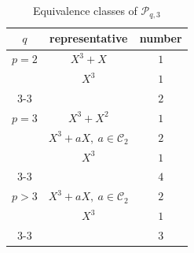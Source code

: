 \documentclass{amsart}
\numberwithin{equation}{section}
\theoremstyle{definition}
\begin{document}
\begin{table}[h]
\caption{Equivalence classes of $\mathcal P_{q,3}$}\label{Tb-q3}
   \renewcommand*{\arraystretch}{1.2}
    \centering
     \begin{tabular}{c|c|c}
     \hline
     	$q$ & representative & number \\ \hline      
        $p=2$ & $X^3+X$ & $1$  \\ 
        & $X^3$ & $1$ \\ \cline{3-3}   
        & & $2$  \\
         \hline
        $p=3$ & $X^3+X^2$ & $1$  \\    
        & $X^3+aX,\ a\in\mathcal C_2$ & $2$  \\
        & $X^3$ & $1$ \\ \cline{3-3}
        & & $4$ \\   \hline 
        $p>3$ & $X^3+aX,\ a\in\mathcal C_2$ & $2$  \\
        & $X^3$ & $1$ \\ \cline{3-3}
        & & $3$ \\   \hline
    \end{tabular}
\end{table}
\end{document}
